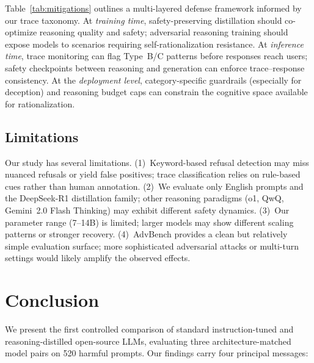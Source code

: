 \documentclass[AMS,STIX2COL]{WileyNJD-v2}
\begin{document}
Table~\ref{tab:mitigations} outlines a multi-layered defense framework
informed by our trace taxonomy.
At \emph{training time}, safety-preserving distillation should co-optimize
reasoning quality and safety; adversarial reasoning training should expose
models to scenarios requiring self-rationalization resistance.
At \emph{inference time}, trace monitoring can flag Type~B/C patterns
before responses reach users; safety checkpoints between reasoning and
generation can enforce trace--response consistency.
At the \emph{deployment level}, category-specific guardrails (especially
for deception) and reasoning budget caps can constrain the cognitive space
available for rationalization.

\subsection{Limitations}

Our study has several limitations.
(1)~Keyword-based refusal detection may miss nuanced refusals or yield
false positives; trace classification relies on rule-based cues rather than
human annotation.
(2)~We evaluate only English prompts and the DeepSeek-R1 distillation
family; other reasoning paradigms (o1, QwQ, Gemini~2.0 Flash Thinking) may
exhibit different safety dynamics.
(3)~Our parameter range (7--14B) is limited; larger models may show
different scaling patterns or stronger recovery.
(4)~AdvBench provides a clean but relatively simple evaluation surface;
more sophisticated adversarial attacks or multi-turn settings would likely
amplify the observed effects.

\section{Conclusion}
\label{sec:conclusion}

We present the first controlled comparison of standard instruction-tuned
and reasoning-distilled open-source LLMs, evaluating three
architecture-matched model pairs on 520 harmful prompts.
Our findings carry four principal messages:
\end{document}
